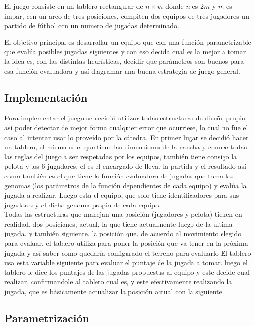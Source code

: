 
El juego consiste en un tablero rectangular de $n \times m$ donde
$n$ es $2m$ y $m$ es impar, con un arco de tres posiciones, compiten dos equipos
de tres jugadores un partido de fútbol con un numero de jugadas determinado.


El objetivo principal es desarrollar un equipo que con una función parametrizable
que evalúa posibles jugadas siguientes y con eso decida cual es la mejor a tomar
la idea es, con las distintas heurísticas, decidir que parámetros son buenos para esa
función evaluadora y así diagramar una buena estrategia de juego general.\\

\subsection{Implementación}


Para implementar el juego se decidió utilizar todas estructuras de diseño propio así poder
detectar de mejor forma cualquier error que ocurriese, lo cual no fue el caso al intentar
usar lo proveído por la cátedra.
En primer lugar se decidió hacer un tablero, el mismo es el que tiene las dimensiones de la cancha y
conoce todas las reglas del juego a ser respetadas por los equipos, también tiene consigo la pelota y los
6 jugadores, el es el encargado de llevar la partida y el resultado así como también es el que tiene la
función evaluadora de jugadas que toma los genomas (los parámetros de la función dependientes de cada equipo)
y evalúa la jugada a realizar.
Luego esta el equipo, que solo tiene identificadores para sus jugadores y el dicho genoma propio de cada equipo.\\


Todas las estructuras que manejan una posición (jugadores y pelota) tienen en realidad, dos posiciones, actual, la que
tiene actualmente luego de la ultima jugada, y también siguiente, la posición que, de acuerdo al
movimiento elegido para evaluar, el tablero utiliza para poner la posición que va tener en la próxima jugada y así
saber como quedaría configurado el terreno para evaluarlo
El tablero usa esta variable siguiente para evaluar el puntaje de la jugada a tomar.
luego el tablero le dice los puntajes de las jugadas propuestas al equipo y este decide cual realizar, confirmandole
al tablero cual es, y este efectivamente realizando la jugada, que es básicamente actualizar la posición actual
con la siguiente.\\

\subsection{Parametrización}

